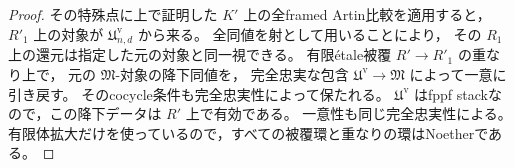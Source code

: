 \begin{proof}
その特殊点に上で証明した $K'$ 上の全framed Artin比較を適用すると，
$R'_1$ 上の対象が $\mathfrak U_{n,d}^{\mathrm v}$ から来る。
全同値を射として用いることにより，
その $R_1$ 上の還元は指定した元の対象と同一視できる。
有限\'etale被覆 $R'\to R'_1$ の重なり上で，
元の $\mathfrak M$-対象の降下同値を，
完全忠実な包含 $\mathfrak U^{\mathrm v}\to\mathfrak M$ によって一意に引き戻す。
そのcocycle条件も完全忠実性によって保たれる。
$\mathfrak U^{\mathrm v}$ はfppf stackなので，この降下データは $R'$ 上で有効である。
一意性も同じ完全忠実性による。
有限体拡大だけを使っているので，すべての被覆環と重なりの環はNoetherである。
\end{proof}
